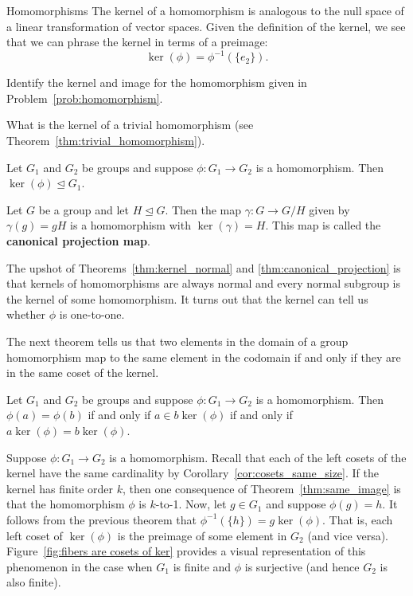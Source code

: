 \begin{section}{Homomorphisms}
The kernel of a homomorphism is analogous to the null space of a linear transformation of vector spaces.  Given the definition of the kernel, we see that we can phrase the kernel in terms of a preimage:
\[
\ker(\phi)=\phi^{-1}(\{e_2\}).
\]

\begin{problem}
Identify the kernel and image for the homomorphism given in Problem~\ref{prob:homomorphism}.
\end{problem}

\begin{problem}
What is the kernel of a trivial homomorphism (see Theorem~\ref{thm:trivial_homomorphism}).
\end{problem}

\begin{theorem}\label{thm:kernel_normal}
Let $G_1$ and $G_2$ be groups and suppose $\phi:G_1\to G_2$ is a homomorphism. Then $\ker(\phi)\trianglelefteq G_1$.
\end{theorem}

\begin{theorem}\label{thm:canonical_projection}
Let $G$ be a group and let $H\trianglelefteq G$.  Then the map $\gamma:G\to G/H$ given by $\gamma(g)=gH$ is a homomorphism with $\ker(\gamma)=H$. This map is called the \textbf{canonical projection map}.
\end{theorem}

The upshot of Theorems~\ref{thm:kernel_normal} and \ref{thm:canonical_projection} is that kernels of homomorphisms are always normal and every normal subgroup is the kernel of some homomorphism. It turns out that the kernel can tell us whether $\phi$ is one-to-one.

The next theorem tells us that two elements in the domain of a group homomorphism map to the same element in the codomain if and only if they are in the same coset of the kernel.

\begin{theorem}\label{thm:same_image}
Let $G_1$ and $G_2$ be groups and suppose $\phi:G_1\to G_2$ is a homomorphism. Then $\phi(a) = \phi(b)$ if and only if $a\in b\ker(\phi)$ if and only if $a\ker(\phi)=b\ker(\phi)$.
\end{theorem}

Suppose $\phi:G_1\to G_2$ is a homomorphism. Recall that each of the left cosets of the kernel have the same cardinality by Corollary~\ref{cor:cosets_same_size}.  If the kernel has finite order $k$, then one consequence of Theorem~\ref{thm:same_image} is that the homomorphism $\phi$ is $k$-to-1. Now, let $g\in G_1$ and suppose $\phi(g)=h$. It follows from the previous theorem that  $\phi^{-1}(\{h\})=g\ker(\phi)$.  That is, each left coset of $\ker(\phi)$ is the preimage of some element in $G_2$ (and vice versa).  Figure~\ref{fig:fibers are cosets of ker} provides a visual representation of this phenomenon in the case when $G_1$ is finite and $\phi$ is surjective (and hence $G_2$ is also finite). 


\end{section}

